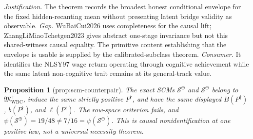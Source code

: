 \documentclass{article}
\newtheorem{proposition}{Proposition}
\begin{document}
\par\smallskip\noindent \textit{Justification.} The theorem records the broadest honest conditional envelope for the fixed hidden-recanting mean without presenting latent bridge validity as observable. \textit{Gap.} WuBaiCui2026 uses completeness for the causal lift; ZhangLiMiaoTchetgen2023 gives abstract one-stage invariance but not this shared-witness causal equality. The primitive content establishing that the envelope is usable is supplied by the calibrated-subclass theorem. \textit{Consumer.} It identifies the NLSY97 wage return operating through cognitive achievement while the same latent non-cognitive trait remains at its general-track value.

\begin{proposition}[prop:scm-counterpair]\label{prop:scm-counterpair}
The exact SCMs \(\mathcal S^{\oplus}\) and \(\mathcal S^{\ominus}\) belong to \(\mathfrak M_{\mathrm{WBC}}^{+}\), induce the same strictly positive \(P^{\dagger}\), and have the same displayed \(B(P^{\dagger})\), \(b(P^{\dagger})\), and \(\ell(P^{\dagger})\). The row-space criterion fails, and \(\psi(\mathcal S^{\oplus})=19/48\neq7/16=\psi(\mathcal S^{\ominus})\). This is causal nonidentification at one positive law, not a universal necessity theorem.
\end{proposition}
\end{document}
